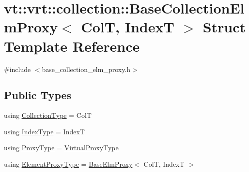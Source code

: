 \hypertarget{structvt_1_1vrt_1_1collection_1_1_base_collection_elm_proxy}{}\section{vt\+:\+:vrt\+:\+:collection\+:\+:Base\+Collection\+Elm\+Proxy$<$ ColT, IndexT $>$ Struct Template Reference}
\label{structvt_1_1vrt_1_1collection_1_1_base_collection_elm_proxy}


{\ttfamily \#include $<$base\+\_\+collection\+\_\+elm\+\_\+proxy.\+h$>$}

\subsection*{Public Types}
\begin{DoxyCompactItemize}
\item 
using \hyperlink{structvt_1_1vrt_1_1collection_1_1_base_collection_elm_proxy_aa3c92d3ae462d11b71c59af00855e414}{Collection\+Type} = ColT
\item 
using \hyperlink{structvt_1_1vrt_1_1collection_1_1_base_collection_elm_proxy_a4905cf19d898a30c0027147decb822b1}{Index\+Type} = IndexT
\item 
using \hyperlink{structvt_1_1vrt_1_1collection_1_1_base_collection_elm_proxy_af80f1576659b626a30828c6d85eca926}{Proxy\+Type} = \hyperlink{namespacevt_a1b417dd5d684f045bb58a0ede70045ac}{Virtual\+Proxy\+Type}
\item 
using \hyperlink{structvt_1_1vrt_1_1collection_1_1_base_collection_elm_proxy_a0f37a49c04c28fdc6ea8665aefc2f40c}{Element\+Proxy\+Type} = \hyperlink{structvt_1_1vrt_1_1collection_1_1_base_elm_proxy}{Base\+Elm\+Proxy}$<$ ColT, IndexT $>$
\end{DoxyCompactItemize}
